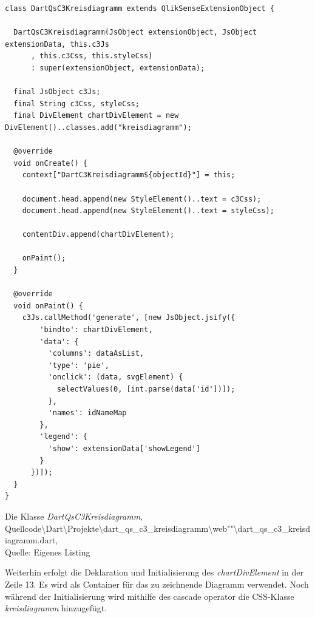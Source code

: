 \ifIncludeFigures\begin{listing}[htbp]
\begin{verbatim}
class DartQsC3Kreisdiagramm extends QlikSenseExtensionObject {

  DartQsC3Kreisdiagramm(JsObject extensionObject, JsObject extensionData, this.c3Js
      , this.c3Css, this.styleCss)
      : super(extensionObject, extensionData);

  final JsObject c3Js;
  final String c3Css, styleCss;
  final DivElement chartDivElement = new DivElement()..classes.add("kreisdiagramm");

  @override
  void onCreate() {
    context["DartC3Kreisdiagramm${objectId}"] = this;

    document.head.append(new StyleElement()..text = c3Css);
    document.head.append(new StyleElement()..text = styleCss);

    contentDiv.append(chartDivElement);

    onPaint();
  }

  @override
  void onPaint() {
    c3Js.callMethod('generate', [new JsObject.jsify({
        'bindto': chartDivElement,
        'data': {
          'columns': dataAsList,
          'type': 'pie',
          'onclick': (data, svgElement) {
            selectValues(0, [int.parse(data['id'])]);
          },
          'names': idNameMap
        },
        'legend': {
          'show': extensionData['showLegend']
        }
      })]);
  }
}
\end{verbatim}
\caption[Die Klasse \textit{DartQsC3Kreisdiagramm}]{Die Klasse \textit{DartQsC3Kreisdiagramm}, \\Quellcode\textbackslash{}Dart\textbackslash{}Projekte\textbackslash{}dart\_qs\_c3\_kreisdiagramm\textbackslash{}web""\textbackslash{}dart\_qs\_c3\_kreisdiagramm.dart, \\Quelle: Eigenes Listing}
\label{lst:DartQsC3KreisdiagrammDartQsC3KreisdiagrammDart}
\end{listing}\fi

Weiterhin erfolgt die Deklaration und Initialisierung des \textit{chartDivElement} in der Zeile 13. Es wird als Container für das zu zeichnende Diagramm verwendet. Noch während der Initialisierung wird mithilfe des cascade operator die CSS-Klasse \textit{kreisdiagramm} hinzugefügt. 

